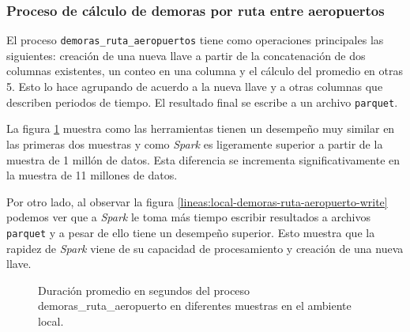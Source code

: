 \subsubsection{Proceso de cálculo de demoras por ruta entre aeropuertos}

El proceso \texttt{demoras\_ruta\_aeropuertos} tiene como operaciones principales las siguientes: creación de una nueva llave a partir de la concatenación de dos columnas existentes, un conteo en una columna y el cálculo del promedio en otras 5. Esto lo hace agrupando de acuerdo a la nueva llave y a otras columnas que describen periodos de tiempo. El resultado final se escribe a un archivo \texttt{parquet}.

La figura \ref{lineas:local-demoras-ruta-aeropuerto} muestra como las herramientas tienen un desempeño muy similar en las primeras dos muestras y como \textit{Spark} es ligeramente superior a partir de la muestra de 1 millón de datos. Esta diferencia se incrementa significativamente en la muestra de 11 millones de datos. 

Por otro lado, al observar la figura \ref{lineas:local-demoras-ruta-aeropuerto-write} podemos ver que a \textit{Spark} le toma más tiempo escribir resultados a archivos \texttt{parquet} y a pesar de ello tiene un desempeño superior. Esto muestra que la rapidez de \textit{Spark} viene de su capacidad de procesamiento y creación de una nueva llave.

\begin{figure}
\centering
{}
\caption{Duración promedio en segundos del proceso demoras\_ruta\_aeropuerto en diferentes muestras en el ambiente local.}
\label{lineas:local-demoras-ruta-aeropuerto}
\end{figure}

